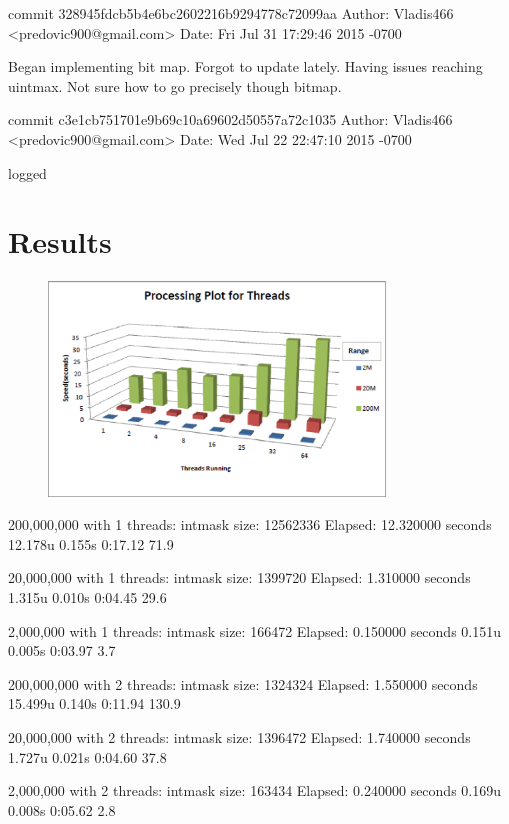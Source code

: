 \documentclass[letterpaper,10pt,titlepage]{article}
\begin{document}
commit 328945fdcb5b4e6bc2602216b9294778c72099aa
Author: Vladis466 <predovic900@gmail.com>
Date:   Fri Jul 31 17:29:46 2015 -0700

    Began implementing bit map. Forgot to update lately. Having issues reaching uintmax. Not sure how to go precisely though bitmap.

commit c3e1cb751701e9b69c10a69602d50557a72c1035
Author: Vladis466 <predovic900@gmail.com>
Date:   Wed Jul 22 22:47:10 2015 -0700

    logged

\section{Results}
\begin{figure}
    \centering
    \includegraphics[width=0.8\textwidth]{graph.eps}
\end{figure}


200,000,000 with 1 threads:
intmask size:  12562336
Elapsed: 12.320000 seconds
12.178u 0.155s 0:17.12 71.9%

20,000,000 with 1 threads:
intmask size:  1399720
Elapsed: 1.310000 seconds
1.315u 0.010s 0:04.45 29.6%


2,000,000 with 1 threads:
intmask size:  166472
Elapsed: 0.150000 seconds
0.151u 0.005s 0:03.97 3.7%





200,000,000 with 2 threads:
intmask size:  1324324
Elapsed: 1.550000 seconds
15.499u 0.140s 0:11.94 130.9%

20,000,000 with 2 threads:
intmask size:  1396472
Elapsed: 1.740000 seconds
1.727u 0.021s 0:04.60 37.8%

2,000,000 with 2 threads:
intmask size:  163434
Elapsed: 0.240000 seconds
0.169u 0.008s 0:05.62 2.8%
\end{document}
